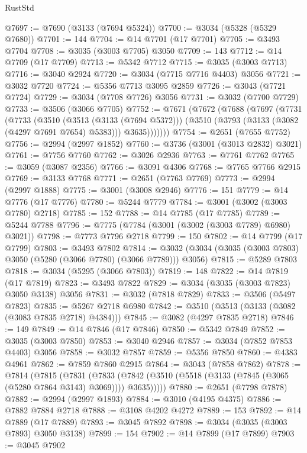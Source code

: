 \begin{lexlean}{RustStd}
\begin{coremodule}
@7697 := @7690 (@3133 (@7694 @5324))
@7700 := @3034 (@5328 (@5329 @7680))
@7701 := 144
@7704 := @14 @7701 (@17 @7701)
@7705 := @3493 @7704
@7708 := @3035 (@3003 @7705) @3050
@7709 := 143
@7712 := @14 @7709 (@17 @7709)
@7713 := @5342 @7712
@7715 := @3035 (@3003 @7713)
@7716 := @3040 @2924
@7720 := @3034 (@7715 @7716 @4403) @3056
@7721 := @3032 @7720
@7724 := @5356 @7713 @3095 @2859
@7726 := @3043 (@7721 @7724)
@7729 := @3034 (@7708 @7726) @3056
@7731 := @3032 (@7700 @7729)
@7733 := @3506 (@3066 @7705)
@7752 := @7671
    (@7672
      (@7688
        (@7697
          (@7731
            (@7733
              (@3510
                (@3513 (@3133 (@7694 @5372)))
                (@3510 (@3793 (@3133 (@3082 (@4297 @7691 @7654) @5383))) @3635)))))))
@7754 := @2651 (@7655 @7752)
@7756 := @2994 (@2997 @1852)
@7760 := @3736 (@3001 (@3013 @2832) @3021)
@7761 := @7756 @7760
@7762 := @3026 @2936
@7763 := @7761 @7762
@7765 := @3059 (@3087 @2356)
@7766 := @3091 @4306
@7768 := @7765 @7766 @2915
@7769 := @3133 @7768
@7771 := @2651 (@7763 @7769)
@7773 := @2994 (@2997 @1888)
@7775 := @3001 (@3008 @2946)
@7776 := 151
@7779 := @14 @7776 (@17 @7776)
@7780 := @5244 @7779
@7784 := @3001 (@3002 (@3003 @7780) @2718)
@7785 := 152
@7788 := @14 @7785 (@17 @7785)
@7789 := @5244 @7788
@7796 := @7775 (@7784 (@3001 (@3002 (@3003 @7789) @6980) @3021))
@7798 := @7773 @7796 @2718
@7799 := 150
@7802 := @14 @7799 (@17 @7799)
@7803 := @3493 @7802
@7814 := @3032 (@3034 (@3035 (@3003 @7803) @3050 (@5280 (@3066 @7780) (@3066 @7789))) @3056)
@7815 := @5289 @7803
@7818 := @3034 (@5295 (@3066 @7803))
@7819 := 148
@7822 := @14 @7819 (@17 @7819)
@7823 := @3493 @7822
@7829 := @3034 (@3035 (@3003 @7823) @3050 @3138) @3056
@7831 := @3032 (@7818 @7829)
@7833 := @3506 (@5497 @7823)
@7835 := @5267 @2718 @6980
@7842 := @3510 (@3513 (@3133 (@3082 (@3083 @7835 @2718) @4384)))
@7845 := @3082 (@4297 @7835 @2718)
@7846 := 149
@7849 := @14 @7846 (@17 @7846)
@7850 := @5342 @7849
@7852 := @3035 (@3003 @7850)
@7853 := @3040 @2946
@7857 := @3034 (@7852 @7853 @4403) @3056
@7858 := @3032 @7857
@7859 := @5356 @7850
@7860 := @4383 @4961
@7862 := @7859 @7860 @2915
@7864 := @3043 (@7858 @7862)
@7878 := @7814
    (@7815
      (@7831
        (@7833 (@7842 (@3510 (@5518 (@3133 (@7845 (@3065 (@5280 @7864 @3143) @3069)))) @3635)))))
@7880 := @2651 (@7798 @7878)
@7882 := @2994 (@2997 @1893)
@7884 := @3010 (@4195 @4375)
@7886 := @7882 @7884 @2718
@7888 := @3108 @4202 @4272
@7889 := 153
@7892 := @14 @7889 (@17 @7889)
@7893 := @3045 @7892
@7898 := @3034 (@3035 (@3003 @7893) @3050 @3138)
@7899 := 154
@7902 := @14 @7899 (@17 @7899)
@7903 := @3045 @7902

\end{coremodule}
\end{lexlean}

